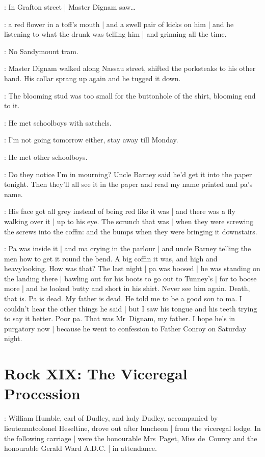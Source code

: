 :
In Grafton street |
Master Dignam saw\ldots

\masterdignam:
a red flower in a toff's mouth |
and a swell pair of kicks on him |
and he listening to what the drunk was telling him |
and grinning all the time.

\masterdignam:
No Sandymount tram.

:
Master Dignam walked along Nassau street,
shifted the porksteaks to his other hand.
His collar sprang up again and he tugged it down.

\masterdignam:
The blooming stud was too small
for the buttonhole of the shirt,
blooming end to it.

:
He met schoolboys with satchels.

\masterdignam:
I'm not going tomorrow either,
stay away till Monday.

:
He met other schoolboys.

\masterdignam:
Do they notice I'm in mourning?
Uncle Barney said he'd get it into the paper tonight.
Then they'll all see it in the paper%
and read my name printed and pa's name.

\masterdignam:
His face got all grey
instead of being red like it was |
and there was a fly walking over it |
up to his eye.
The scrunch that was |
when they were screwing the screws into the coffin:
and the bumps when they were bringing it downstairs.

\masterdignam:
Pa was inside it |
and ma crying in the parlour |
and uncle Barney telling the men
how to get it round the bend.
A big coffin it was,
and high and heavylooking.
How was that?
The last night |
pa was boosed |
he was standing on the landing there |
bawling out for his boots to go out to Tunney's |
for to boose more |
and he looked butty and short in his shirt.
Never see him again.
Death, that is.
Pa is dead.
My father is dead.%
He told me to be a good son to ma.
I couldn't hear the other things he said |
but I saw his tongue and his teeth trying to say it better.
Poor pa.
That was Mr~Dignam, my father.
I hope he's in purgatory now |
because he went to confession to Father Conroy on Saturday night.


\bigskip
\section*{Rock XIX: The Viceregal Procession}


:
William Humble,
earl of Dudley,
and lady Dudley,
accompanied by lieutenant\-colonel Heseltine,
drove out after luncheon |
from the viceregal lodge.
In the following carriage |
were the honourable Mrs~Paget,
Miss de~Courcy
and the honourable Gerald Ward A.D.C. |
in attendance.

